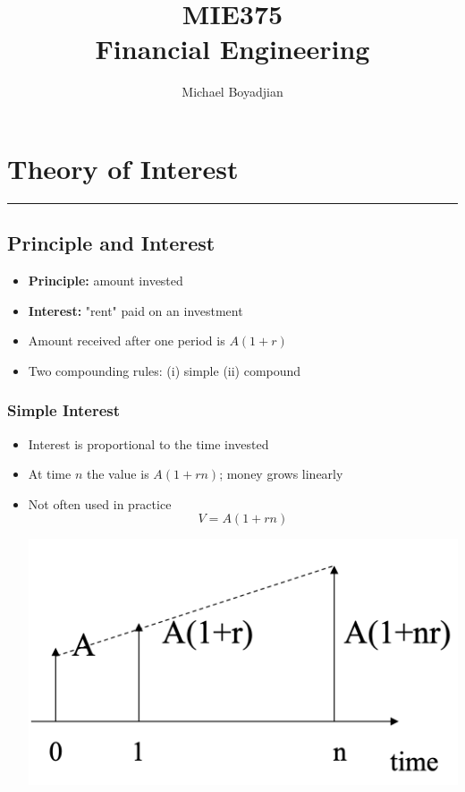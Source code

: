 \documentclass[11pt]{article}
\begin{document}
\title{MIE375  \\ Financial Engineering}
\author{Michael Boyadjian}
\maketitle
\pagebreak

\tableofcontents

\pagebreak

\bigskip
\bigskip
\bigskip

\section{Theory of Interest}
\hrule \vspace{15pt}

\subsection{Principle and Interest}
\begin{itemize}
\item \textbf{Principle:} amount invested
\item\textbf{Interest: }"rent" paid on an investment
\item Amount received after one period is $A(1+r)$
\item Two compounding rules: (i) simple (ii) compound
\end{itemize}

\subsubsection{Simple Interest}
\begin{itemize}
\item Interest is proportional to the time invested
\item At time $n$ the value is $A(1+rn)$; money grows linearly
\item Not often used in practice
$$ V = A(1+rn)$$
\begin{center}
\includegraphics[scale=0.4]{images/simple.png} 
\end{center}
\end{itemize}
\end{document}
